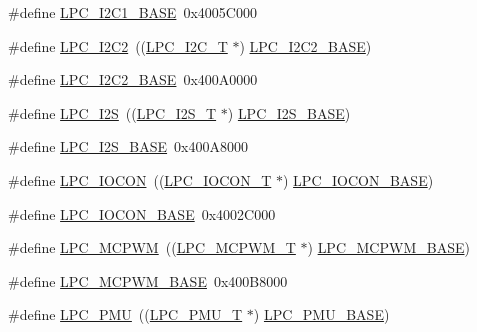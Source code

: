 \begin{DoxyCompactItemize}
\item 
\#define \hyperlink{group__PERIPH__175X__6X__BASE_gae59f73cf24ff126be3b9a8b921926676}{L\+P\+C\+\_\+\+I2\+C1\+\_\+\+B\+A\+SE}~0x4005\+C000
\item 
\#define \hyperlink{group__PERIPH__175X__6X__BASE_ga6bcdaa0ab66f4e3d213a488b34055557}{L\+P\+C\+\_\+\+I2\+C2}~((\hyperlink{structLPC__I2C__T}{L\+P\+C\+\_\+\+I2\+C\+\_\+T}              $\ast$) \hyperlink{group__PERIPH__407X__8X__BASE_ga00796bd1f1fa200bbffcd9e7e8679eaa}{L\+P\+C\+\_\+\+I2\+C2\+\_\+\+B\+A\+SE})
\item 
\#define \hyperlink{group__PERIPH__175X__6X__BASE_ga00796bd1f1fa200bbffcd9e7e8679eaa}{L\+P\+C\+\_\+\+I2\+C2\+\_\+\+B\+A\+SE}~0x400\+A0000
\item 
\#define \hyperlink{group__PERIPH__175X__6X__BASE_ga1d2800cab1a50bdf99efe66d6028b663}{L\+P\+C\+\_\+\+I2S}~((\hyperlink{structLPC__I2S__T}{L\+P\+C\+\_\+\+I2\+S\+\_\+T}              $\ast$) \hyperlink{group__PERIPH__407X__8X__BASE_gacff8b54e3924910d381e6b8ba804050c}{L\+P\+C\+\_\+\+I2\+S\+\_\+\+B\+A\+SE})
\item 
\#define \hyperlink{group__PERIPH__175X__6X__BASE_gacff8b54e3924910d381e6b8ba804050c}{L\+P\+C\+\_\+\+I2\+S\+\_\+\+B\+A\+SE}~0x400\+A8000
\item 
\#define \hyperlink{group__PERIPH__175X__6X__BASE_gaabc651799ba17b0dd4a0114c8d48a145}{L\+P\+C\+\_\+\+I\+O\+C\+ON}~((\hyperlink{structLPC__IOCON__T}{L\+P\+C\+\_\+\+I\+O\+C\+O\+N\+\_\+T}            $\ast$) \hyperlink{group__PERIPH__407X__8X__BASE_gae48aea115d5924805263d7a15402d4fa}{L\+P\+C\+\_\+\+I\+O\+C\+O\+N\+\_\+\+B\+A\+SE})
\item 
\#define \hyperlink{group__PERIPH__175X__6X__BASE_gae48aea115d5924805263d7a15402d4fa}{L\+P\+C\+\_\+\+I\+O\+C\+O\+N\+\_\+\+B\+A\+SE}~0x4002\+C000
\item 
\#define \hyperlink{group__PERIPH__175X__6X__BASE_ga6fe8e415821195a786b3f0dc5e7fc9fa}{L\+P\+C\+\_\+\+M\+C\+P\+WM}~((\hyperlink{structLPC__MCPWM__T}{L\+P\+C\+\_\+\+M\+C\+P\+W\+M\+\_\+T}            $\ast$) \hyperlink{group__PERIPH__407X__8X__BASE_gad8a41dc802e3ea0ba9457d42a6927c03}{L\+P\+C\+\_\+\+M\+C\+P\+W\+M\+\_\+\+B\+A\+SE})
\item 
\#define \hyperlink{group__PERIPH__175X__6X__BASE_gad8a41dc802e3ea0ba9457d42a6927c03}{L\+P\+C\+\_\+\+M\+C\+P\+W\+M\+\_\+\+B\+A\+SE}~0x400\+B8000
\item 
\#define \hyperlink{group__PERIPH__175X__6X__BASE_ga9d540cc313db00679c10f9ac1961b06a}{L\+P\+C\+\_\+\+P\+MU}~((\hyperlink{structLPC__PMU__T}{L\+P\+C\+\_\+\+P\+M\+U\+\_\+T}              $\ast$) \hyperlink{group__PERIPH__407X__8X__BASE_ga865bed8ad61e9e273439ad1349a46d68}{L\+P\+C\+\_\+\+P\+M\+U\+\_\+\+B\+A\+SE})

\end{DoxyCompactItemize}
